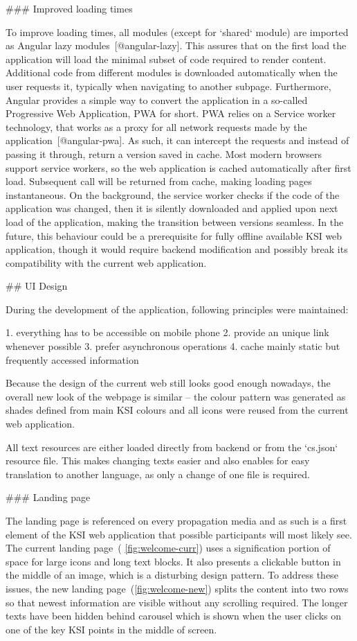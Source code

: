 \documentclass[
  digital, %
  oneside, %
  lof,     %
  lot,     %
]{fithesis4}
\begin{document}
{### Improved loading times
\label{chap:faster}

To improve loading times, all modules (except for `shared` module) are imported as Angular lazy modules~[@angular-lazy]. This assures that on the first load the application will load the minimal subset of code required to render content. Additional code from different modules is downloaded automatically when the user requests it, typically when navigating to another subpage. Furthermore, Angular provides a simple way to convert the application in a so-called Progressive Web Application, PWA for short. PWA relies on a Service worker technology, that works as a proxy for all network requests made by the application~[@angular-pwa]. As such, it can intercept the requests and instead of passing it through, return a version saved in cache. Most modern browsers support service workers, so the web application is cached automatically after first load. Subsequent call will be returned from cache, making loading pages instantaneous. On the background, the service worker checks if the code of the application was changed, then it is silently downloaded and applied upon next load of the application, making the transition between versions seamless. In the future, this behaviour could be a prerequisite for fully offline available KSI web application, though it would require backend modification and possibly break its compatibility with the current web application.

## UI Design

During the development of the application, following principles were maintained:

1. everything has to be accessible on mobile phone
2. provide an unique link whenever possible
3. prefer asynchronous operations
4. cache mainly static but frequently accessed information

Because the design of the current web still looks good enough nowadays, the overall new look of the webpage is similar -- the colour pattern was generated as shades defined from main KSI colours and all icons were reused from the current web application.

All text resources are either loaded directly from backend or from the `cs.json` resource file. This makes changing texts easier and also enables for easy translation to another language, as only a change of one file is required.

### Landing page

The landing page is referenced on every propagation media and as such is a first element of the KSI web application that possible participants will most likely see. The current landing page~( \autoref{fig:welcome-curr}) uses a signification portion of space for large icons and long text blocks. It also presents a clickable button in the middle of an image, which is a disturbing design pattern. To address these issues, the new landing page~(\autoref{fig:welcome-new}) splits the content into two rows so that newest information are visible without any scrolling required. The longer texts have been hidden behind carousel which is shown when the user clicks on one of the key KSI points in the middle of screen.

}
\end{document}
